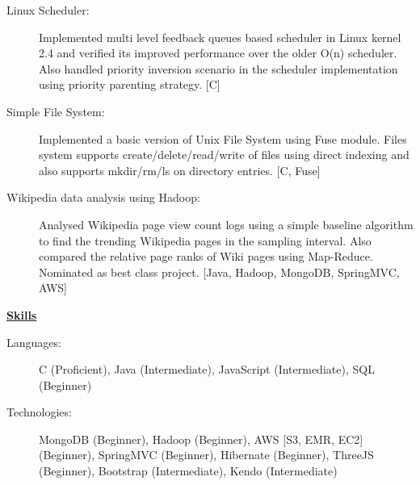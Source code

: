 \documentclass[letterpaper,11pt]{article}
\newcommand{\resheading}[1]{{\large \colorbox{mygrey}{\begin{minipage}{\textwidth}{\textbf{#1 \vphantom{p\^{E}}}}\end{minipage}}}\vspace{6pt}}
\begin{document}
\begin{description}
\item[Linux Scheduler:] { \footnotesize Implemented multi level feedback queues based scheduler in Linux kernel 2.4 and verified its improved performance over the older O(n) scheduler. Also handled priority inversion scenario in the scheduler implementation using priority parenting strategy. [C]}

\item[Simple File System:] { \footnotesize Implemented a basic version of Unix File System using Fuse module. Files system supports create/delete/read/write of files using direct indexing and also supports mkdir/rm/ls on directory entries. [C, Fuse]}

\item[Wikipedia data analysis using Hadoop:] { \footnotesize Analysed Wikipedia page view count logs using a simple baseline algorithm to find the trending Wikipedia pages in the sampling interval. Also compared the relative page ranks of Wiki pages using Map-Reduce. Nominated as best class project. [Java, Hadoop, MongoDB, SpringMVC, AWS]}

\end{description}

%
%

\resheading{\href{http://www.ashish-jindal.com/}{Skills}}
	\begin{description}
		\item[Languages:] { \footnotesize C (Proficient), Java (Intermediate), JavaScript (Intermediate), SQL (Beginner)
		}
		\item[Technologies:] { \footnotesize
			MongoDB (Beginner), Hadoop (Beginner), AWS [S3, EMR, EC2] (Beginner), SpringMVC (Beginner), Hibernate (Beginner), ThreeJS (Beginner), Bootstrap (Intermediate), Kendo (Intermediate)
		}

	\end{description} %
\end{document}
